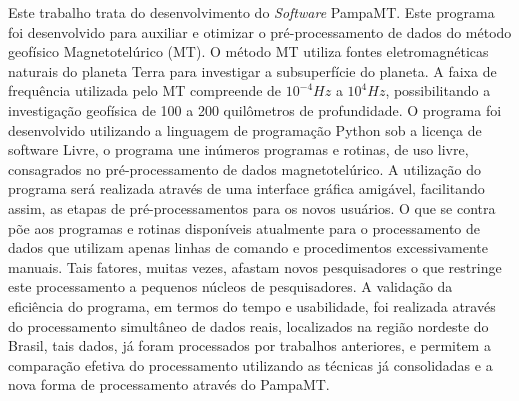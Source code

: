 \documentclass[12pt,twoside,oneright,a4paper,chapter=TITLE,english,brazil]{unipampa}
\newcommand{\en}[1]{\textit{#1}}
\newcommand{\Software}{\en{Software}}
\begin{document}
\begin{resumo}
 Este trabalho trata do desenvolvimento do \Software{} PampaMT. Este programa foi desenvolvido para auxiliar e otimizar o pré-processamento de dados do método geofísico Magnetotelúrico (MT). O método MT utiliza fontes eletromagnéticas naturais do planeta Terra para investigar a subsuperfície do planeta. A faixa de frequência utilizada pelo MT compreende de $10^{-4} Hz$ a $10^{4} Hz$, possibilitando a investigação geofísica de 100 a 200 quilômetros de profundidade. O programa foi desenvolvido utilizando a linguagem de programação Python sob a licença de software Livre, o programa une inúmeros programas e rotinas, de uso livre, consagrados no pré-processamento de dados magnetotelúrico. A utilização do programa será realizada através de uma interface gráfica amigável, facilitando assim, as etapas de pré-processamentos para os novos usuários. O que se contra põe aos programas e rotinas disponíveis atualmente para o processamento de dados que utilizam apenas linhas de comando e procedimentos excessivamente manuais. Tais fatores, muitas vezes, afastam novos pesquisadores o que restringe este processamento a pequenos núcleos de pesquisadores. A validação da eficiência do programa, em termos do tempo e usabilidade, foi realizada através do processamento simultâneo de dados reais, localizados na região nordeste do Brasil, tais dados, já foram processados por trabalhos anteriores, e permitem a comparação efetiva do processamento utilizando as técnicas já consolidadas e a nova forma de processamento através do PampaMT.  
\end{resumo}
\end{document}
